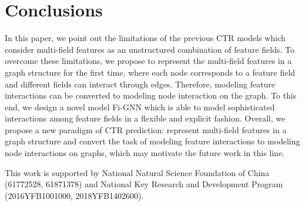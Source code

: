\documentclass[sigconf]{acmart}
\begin{document}
\section{Conclusions}
In this paper, we point out the limitations of the previous CTR models which consider multi-field features as an unstructured combination of feature fields.
To overcome these limitations, we propose to represent the multi-field features in a graph structure for the first time, where each node corresponds to a feature field and different fields can interact through edges.
Therefore, modeling feature interactions can be converted to modeling node interaction on the graph.  
To this end, we design a novel model Fi-GNN which is able to model sophisticated interactions among feature fields in a flexible and explicit fashion.
Overall, we propose a new paradigm of CTR prediction: represent multi-field features in a graph structure and convert the task of modeling feature interactions to modeling node interactions on graphs, which may motivate the future work in this line.




\begin{acks}
This work is supported by National Natural Science Foundation of China (61772528, 61871378) and National Key Research and Development Program (2016YFB1001000, 2018YFB1402600).
\end{acks}




\end{document}
